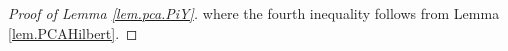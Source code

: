 \documentclass[11pt]{article} %
\begin{document}
\begin{proof}[Proof of Lemma \ref{lem.pca.PiY}]
	where the fourth inequality follows from Lemma \ref{lem.PCAHilbert}.
	
	
	

\end{proof}
\end{document}
